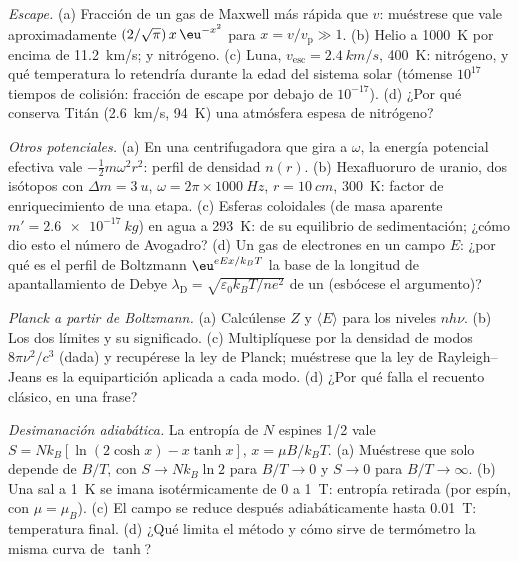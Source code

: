 \begin{exercise}[$\star\star$]\label{exo:b2:boltzmann-factor:9}
\emph{Escape.} (a) Fracción de un gas de Maxwell más rápida que $v$: muéstrese que
vale aproximadamente $(2/\sqrt\pi)\,x\,\eu^{-x^2}$ para $x = v/v_{\text{p}} \gg 1$.
(b) Helio a \qty{1000}{K} por encima de \qty{11.2}{km/s}; y nitrógeno. (c) Luna,
$v_{\text{esc}} = \qty{2.4}{km/s}$, \qty{400}{K}: nitrógeno, y qué
temperatura lo retendría durante la edad del sistema solar (tómense $10^{17}$
tiempos de colisión: fracción de escape por debajo de $10^{-17}$). (d) ¿Por qué conserva Titán
(\qty{2.6}{km/s}, \qty{94}{K}) una atmósfera espesa de nitrógeno?
\end{exercise}

\begin{exercise}[$\star\star\star$]\label{exo:b2:boltzmann-factor:10}
\emph{Otros potenciales.} (a) En una centrifugadora que gira a $\omega$, la
energía potencial efectiva vale $-\tfrac12m\omega^2r^2$: perfil de densidad
$n(r)$. (b) Hexafluoruro de uranio, dos isótopos con $\Delta m = \qty{3}{u}$, $\omega
= 2\pi \times \qty{1000}{Hz}$, $r = \qty{10}{cm}$, \qty{300}{K}: factor de
enriquecimiento de una etapa. (c) Esferas coloidales (de masa aparente $m' =
\qty{2.6e-17}{kg}$) en agua a \qty{293}{K}:  de su
equilibrio de sedimentación; ¿cómo dio esto el número de Avogadro? (d) Un
gas de electrones en un campo $E$: ¿por qué es el perfil de Boltzmann
$\eu^{eEx/k_BT}$ la base de la longitud de apantallamiento de Debye
$\lambda_{\text{D}} = \sqrt{\varepsilon_0k_BT/ne^2}$ de un  (esbócese el
argumento)?
\end{exercise}

\begin{exercise}[$\star\star\star$]\label{exo:b2:boltzmann-factor:11}
\emph{Planck a partir de Boltzmann.} (a) Calcúlense $Z$ y $\langle E\rangle$ para
los niveles $nh\nu$. (b) Los dos límites y su significado. (c) Multiplíquese por
la densidad de modos $8\pi\nu^2/c^3$ (dada) y recupérese la ley de Planck;
muéstrese que la ley de Rayleigh--Jeans es la equipartición aplicada a cada modo.
(d) ¿Por qué falla el recuento clásico, en una frase?
\end{exercise}

\begin{exercise}[$\star\star\star$]\label{exo:b2:boltzmann-factor:12}
\emph{Desimanación adiabática.} La entropía de $N$ espines 1/2 vale $S =
Nk_B[\ln(2\cosh x) - x\tanh x]$, $x = \mu B/k_BT$. (a) Muéstrese que solo depende
de $B/T$, con $S \to Nk_B\ln 2$ para $B/T \to 0$ y $S \to 0$ para $B/T
\to \infty$. (b) Una sal a \qty{1}{K} se imana isotérmicamente de $0$ a
\qty{1}{T}: entropía retirada (por espín, con $\mu = \mu_B$). (c) El campo
se reduce después adiabáticamente hasta \qty{0.01}{T}: temperatura final. (d)
¿Qué limita el método y cómo sirve de termómetro la misma curva de $\tanh$?
\end{exercise}

